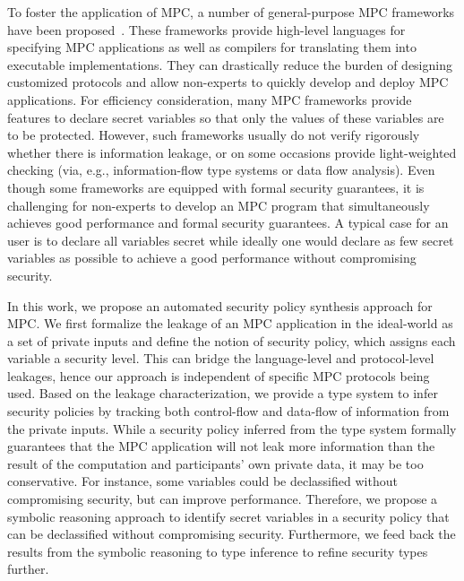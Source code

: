 To foster the application of MPC, a number of %
general-purpose MPC frameworks have been proposed~\cite{HeneckaKSSW10,SchropferKM11,BogdanovLR14,RastogiHH14,LaudR15,Demmler0Z15,MohasselR18,hycc18,aby221,NielsenS07,Mitchell0SZ12,picco13,LiuHSKH14,LiuWNHS15,ZahurE15,ChandranGRST19,MPyC20,spdz20,RastogiSH19}.
These frameworks provide high-level languages for specifying MPC applications as well as compilers for translating them into executable implementations. They can drastically reduce the burden of designing customized protocols and allow non-experts to quickly develop
and deploy MPC applications.
For efficiency consideration, many MPC frameworks provide features to declare secret variables so that only the values of these variables are to be protected.
However, such frameworks usually do not verify rigorously whether there is information leakage, or
%
on some occasions provide light-weighted checking (via, e.g.,  information-flow type systems or data flow analysis).
%
Even though some frameworks are %
equipped with formal security guarantees,
it is challenging for non-experts to develop an MPC program that simultaneously achieves good performance and formal security guarantees. A typical case for an user is to declare all variables secret while ideally
one would declare as
few secret variables as possible to achieve a good performance without compromising security. %


In this work, we propose an automated security policy synthesis approach for MPC.
We first formalize the leakage of an MPC application in the ideal-world as a
set of private inputs and define the notion
of security policy, which assigns each variable a security level. This can bridge the
language-level and protocol-level leakages, hence our approach is independent
of specific MPC protocols being used.
Based on the leakage characterization, we provide  a type
system to  infer security policies by tracking both control-flow and data-flow of information from the private inputs.
While a security policy inferred from the type system formally guarantees that the MPC application will not leak more information than the result of the computation and participants' own private data,
it may be too conservative. For instance, some variables could be declassified without compromising security, but can improve
performance. Therefore, we propose a symbolic reasoning approach to identify secret variables
in a security policy that can be declassified without compromising security.
Furthermore, we feed back the results from the symbolic reasoning to type inference to refine security types further.

